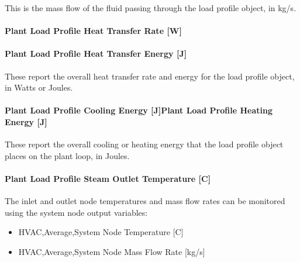 This is the mass flow of the fluid passing through the load profile object, in kg/s.

\paragraph{Plant Load Profile Heat Transfer Rate {[}W{]}}\label{plant-load-profile-heat-transfer-rate-w}

\paragraph{Plant Load Profile Heat Transfer Energy {[}J{]}}\label{plant-load-profile-heat-transfer-energy-j}

These report the overall heat transfer rate and energy for the load profile object, in Watts or Joules.

\paragraph{Plant Load Profile Cooling Energy {[}J{]}Plant Load Profile Heating Energy {[}J{]}}\label{plant-load-profile-cooling-energy-jplant-load-profile-heating-energy-j}

These report the overall cooling or heating energy that the load profile object places on the plant loop, in Joules.

\paragraph{Plant Load Profile Steam Outlet Temperature {[}C{]}}\label{plant-load-profile-steam-outlet-temperature-c}

The inlet and outlet node temperatures and mass flow rates can be monitored using the system node output variables:

\begin{itemize}
\item
  HVAC,Average,System Node Temperature {[}C{]}
\item
  HVAC,Average,System Node Mass Flow Rate {[}kg/s{]}
\end{itemize}